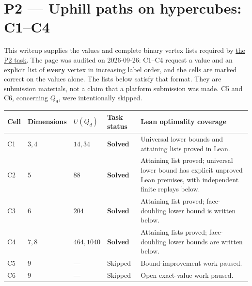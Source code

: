 \documentclass[11pt,a4paper]{article}
\begin{document}
\section{P2 --- Uphill paths on hypercubes: C1--C4}\label{p2-uphill-paths-on-hypercubes-c1c4}

This writeup supplies the values and complete binary vertex lists required by \href{https://hackathon.bainsa.ai/p/p2}{the P2 task}. The page was audited on 2026-09-26: C1--C4 request a value and an explicit list of \textbf{every} vertex in increasing label order, and the cells are marked correct on the values alone. The lists below satisfy that format. They are submission materials, not a claim that a platform submission was made. C5 and C6, concerning \(Q_9\), were intentionally skipped.

{\def\LTcaptype{none} %
\begin{longtable}[]{@{}
  >{\raggedright\arraybackslash}p{}
  >{\raggedright\arraybackslash}p{}
  >{\raggedright\arraybackslash}p{}
  >{\raggedright\arraybackslash}p{}
  >{\raggedright\arraybackslash}p{}@{}}
\toprule\noalign{}
\begin{minipage}[b]{\linewidth}\raggedright
Cell
\end{minipage} & \begin{minipage}[b]{\linewidth}\raggedright
Dimensions
\end{minipage} & \begin{minipage}[b]{\linewidth}\raggedright
\(U(Q_d)\)
\end{minipage} & \begin{minipage}[b]{\linewidth}\raggedright
Task status
\end{minipage} & \begin{minipage}[b]{\linewidth}\raggedright
Lean optimality coverage
\end{minipage} \\
\midrule\noalign{}
\endhead
\bottomrule\noalign{}
\endlastfoot
C1 & \(3,4\) & \(14,34\) & \textbf{Solved} & Universal lower bounds and attaining lists proved in Lean. \\
C2 & \(5\) & \(88\) & \textbf{Solved} & Attaining list proved; universal lower bound has explicit unproved Lean premises, with independent finite replays below. \\
C3 & \(6\) & \(204\) & \textbf{Solved} & Attaining list proved; face-doubling lower bound is written below. \\
C4 & \(7,8\) & \(464,1040\) & \textbf{Solved} & Attaining lists proved; face-doubling lower bounds are written below. \\
C5 & \(9\) & --- & Skipped & Bound-improvement work paused. \\
C6 & \(9\) & --- & Skipped & Open exact-value work paused. \\
\end{longtable}
}
\end{document}
